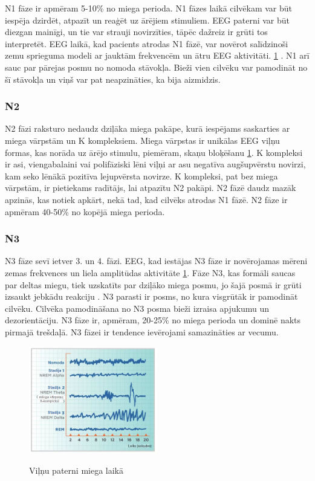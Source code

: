 \documentclass[12pt,paper=A4]{report}
\begin{document}
    N1 fāze ir apmēram 5-10\% no miega perioda. N1 fāzes laikā cilvēkam var būt iespēja dzirdēt, atpazīt un reaģēt uz ārējiem stimuliem. EEG paterni var būt diezgan mainīgi, un tie var strauji novirzīties, tāpēc dažreiz ir grūti tos interpretēt. EEG laikā, kad pacients atrodas N1 fāzē, var novērot salīdzinoši zemu sprieguma modeli ar jauktām frekvencēm un ātru EEG aktivitāti. \ref{waves} \cite{SleepStagesSecure}.  N1 arī sauc par pārejas posmu no nomoda stāvokļa. Bieži vien cilvēku var pamodināt no šī stāvokļa un viņš var pat neapzināties, ka bija aizmidzis. 
    
\subsubsection{N2}     

    N2 fāzi raksturo nedaudz dziļāka miega pakāpe, kurā iespējams saskarties ar miega vārpstām \cite{SleepStageScoring} un K kompleksiem. Miega vārpstas ir unikālas EEG viļņu formas, kas norāda uz ārējo stimulu, piemēram, skaņu bloķēšanu \ref{waves}. K kompleksi ir
asi, viengabalaini vai polifāziski lēni viļņi ar asu negatīva augšupvērstu novirzi, kam seko lēnākā pozitīva lejupvērsta novirze. K kompleksi, pat bez miega vārpstām, ir pietiekams radītājs, lai atpazītu N2 pakāpi. N2 fāzē daudz mazāk apzinās, kas notiek apkārt, nekā tad, kad cilvēks atrodas N1 fāzē. N2 fāze ir apmēram 40-50\% no kopējā miega perioda. 
    
\subsubsection{N3}

   N3 fāze sevī ietver 3. un 4. fāzi. EEG, kad iestājas N3 fāze ir novērojamas mēreni zemas frekvences un liela amplitūdas aktivitāte \ref{waves}. Fāze N3, kas formāli saucas par deltas miegu, tiek uzskatīts par dziļāko miega posmu, jo šajā posmā ir grūti izsaukt jebkādu reakciju \cite{SleepStageScoring}. N3 parasti ir posms, no kura visgrūtāk ir pamodināt cilvēku. Cilvēka pamodināšana no N3 posma bieži izraisa apjukumu un dezorientāciju. N3 fāze ir, apmēram, 20-25\% no miega perioda un dominē nakts pirmajā trešdaļā. N3 fāzei ir tendence ievērojami samazināties ar vecumu. 
    
   \begin{figure}[H] \centering
\includegraphics[width=0.50\textwidth]{sleepRecording} 
\caption{Viļņu paterni miega laikā}\cite{seneviratne2017electroencephalography} \label{waves} 
\end{figure}
 
\end{document}
